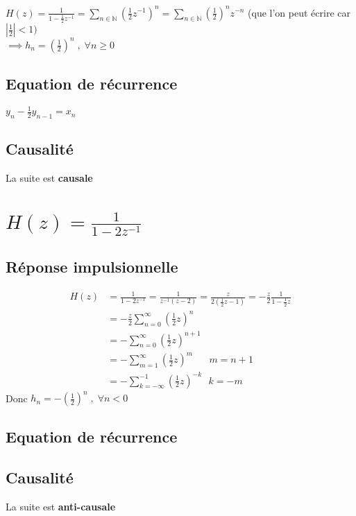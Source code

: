 \documentclass{article}
\begin{document}
$H(z) = \frac{1}{1 - \frac{1}{2}z^{-1}} = \displaystyle\sum_{n \in \mathbb{N}}{(\frac{1}{2}z^{-1})^{n}} = \displaystyle\sum_{n \in \mathbb{N}}{(\frac{1}{2})^n z^{-n}}$ (que l'on peut écrire car $ |\frac{1}{2}| < 1)$ \\ $\implies h_n = (\frac{1}{2})^n \;,\; \forall n \geq 0$
\subsection*{Equation de récurrence}
$y_n - \frac{1}{2}y_{n-1}= x_n$
\subsection*{Causalité}
La suite est \textbf{causale}
\section{$H(z) = \frac{1}{1 - 2z^{-1}}$}
\subsection*{Réponse impulsionnelle}
\begin{equation*}\begin{split} 
H(z) &= \frac{1}{1 - 2z^{-1}} = \frac{1}{z^{-1}(z-2)} = \frac{z}{2(\frac{1}{2}z-1)} = -\frac{z}{2} \frac{1}{1-\frac{1}{2}z} \\
&= -\frac{z}{2} \displaystyle\sum_{n=0}^\infty{(\frac{1}{2}z)^{n}} \\
&= -\displaystyle\sum_{n=0}^\infty{(\frac{1}{2}z)^{n+1}} \\
&= -\displaystyle\sum_{m=1}^\infty{(\frac{1}{2}z)^{m}} \hspace{20pt} m = n+1\\
&= -\displaystyle\sum_{k=-\infty}^{-1}{(\frac{1}{2}z)^{-k}} \hspace{8pt} k = -m
\end{split}\end{equation*}
Donc $h_n = -(\frac{1}{2})^n \;,\; \forall n < 0$
\subsection*{Equation de récurrence}
\subsection*{Causalité}
La suite est \textbf{anti-causale}
\end{document}
